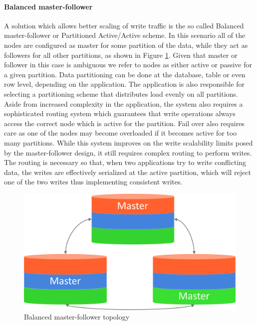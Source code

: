 \paragraph{Balanced master-follower}
A solution which allows better scaling of write traffic is the so called Balanced master-follower or Partitioned Active/Active scheme.
In this scenario all of the nodes are configured as master for some partition of the data, while they act as followers for all other partitions, as shown in Figure \ref{fig:balanced-master-follower}.
Given that master or follower in this case is ambiguous we refer to nodes as either active or passive for a given partition.
Data partitioning can be done at the database, table or even row level, depending on the application.
The application is also responsible for selecting a partitioning scheme that distributes load evenly on all partitions.
Aside from increased complexity in the application, the system also requires a sophisticated routing system which guarantees that write operations always access the correct node which is active for the partition.
Fail over also requires care as one of the nodes may become overloaded if it becomes active for too many partitions.
While this system improves on the write scalability limits posed by the master-follower design, it still requires complex routing to perform writes.
The routing is necessary so that, when two applications try to write conflicting data, the writes are effectively serialized at the active partition, which will reject one of the two writes thus implementing consistent writes.

\begin{figure}[h]
\caption{Balanced master-follower topology}
\label{fig:balanced-master-follower}
\centering
\includegraphics[width=1.0\textwidth]{images/balanced-master-follower.png}
\end{figure}

